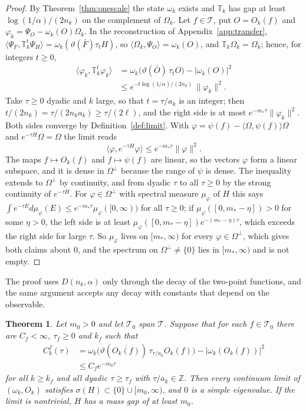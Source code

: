 \documentclass[aps,prd,twocolumn,superscriptaddress,nofootinbib,longbibliography,floatfix,amsmath,amssymb,10pt]{revtex4-2}
\newtheorem{theorem}{Theorem}
\theoremstyle{definition}
\theoremstyle{remark}
\newcommand{\Z}{\mathbb{Z}}
\newcommand{\ip}[2]{\langle #1,#2\rangle}
\begin{document}
\begin{proof}
By Theorem~\ref{thm:onescale} the state $\omega_k$ exists and $\mathbb T_k$ has gap
at least $\log(1/\alpha)/(2n_k)$ on the complement of $\Omega_k$. Let $f\in
\mathcal T$, put $O=O_k(f)$ and $\varphi_k=\Psi_O-\omega_k(O)\Omega_k$. In
the reconstruction of Appendix~\ref{app:transfer},
$\ip{\Psi_F}{\mathbb T_k^t\Psi_H}=\omega_k(\vartheta(\bar F)\tau_tH)$, so
$\ip{\Omega_k}{\Psi_O}=\omega_k(O)$, and $\mathbb T_k\Omega_k=\Omega_k$; hence, for integers $t\ge0$,
\[
\begin{split}
\ip{\varphi_k}{\mathbb T_k^t\varphi_k}&=\omega_k\bigl(\vartheta(\bar O)\,\tau_tO\bigr)
-|\omega_k(O)|^2\\
&\le e^{-t\log(1/\alpha)/(2n_k)}\,\|\varphi_k\|^2 .
\end{split}
\]
Take $\tau\ge0$ dyadic and $k$ large, so that $t=\tau/a_k$ is an integer;
then $t/(2n_k)=\tau/(2n_ka_k)\ge\tau/(2\ell)$, and the right side is at most
$e^{-m_*\tau}\|\varphi_k\|^2$. Both sides converge by
Definition~\ref{def:limit}. With $\varphi=\psi(f)-\ip\Omega{\psi(f)}\Omega$
and $e^{-\tau H}\Omega=\Omega$ the limit reads
\[
\ip\varphi{e^{-\tau H}\varphi}\le e^{-m_*\tau}\|\varphi\|^2 .
\]
The maps $f\mapsto O_k(f)$ and $f\mapsto\psi(f)$ are linear, so the vectors
$\varphi$ form a linear subspace, and it is dense in $\Omega^\perp$ because
the range of $\psi$ is dense. The inequality extends to $\Omega^\perp$ by
continuity, and from dyadic $\tau$ to all $\tau\ge0$ by the strong continuity
of $e^{-\tau H}$. For $\varphi\in\Omega^\perp$ with spectral measure
$\mu_\varphi$ of $H$ this says $\int e^{-\tau E}d\mu_\varphi(E)\le e^{-m_*\tau}
\mu_\varphi([0,\infty))$ for all $\tau\ge0$; if $\mu_\varphi([0,m_*-\eta])>0$
for some $\eta>0$, the left side is at least $\mu_\varphi([0,m_*-\eta])
e^{-(m_*-\eta)\tau}$, which exceeds the right side for large $\tau$. So
$\mu_\varphi$ lives on $[m_*,\infty)$ for every $\varphi\in\Omega^\perp$, which
gives both claims about $0$, and the spectrum on $\Omega^\perp\ne\{0\}$ lies in
$[m_*,\infty)$ and is not empty.
\end{proof}

The proof uses $D(n_k,\alpha)$ only through the decay of the two-point
functions, and the same argument accepts any decay with constants that
depend on the observable.

\begin{theorem}\label{thm:clustering}
Let $m_0>0$ and let $\mathcal T_0$ span $\mathcal T$. Suppose that for each
$f\in\mathcal T_0$ there are $C_f<\infty$, $\tau_f\ge0$ and $k_f$ such that
\begin{align*}
C^f_k(\tau)&=\omega_k\bigl(\vartheta(\overline{O_k(f)})\,\tau_{\tau/a_k}
O_k(f)\bigr)-|\omega_k(O_k(f))|^2\\
&\le C_fe^{-m_0\tau}
\end{align*}
for all $k\ge k_f$ and all dyadic $\tau\ge\tau_f$ with $\tau/a_k\in\Z$.
Then every continuum limit of $(\omega_k,O_k)$ satisfies $\sigma(H)\subset
\{0\}\cup[m_0,\infty)$, and $0$ is a simple eigenvalue. If the limit is
nontrivial, $H$ has a mass gap of at least $m_0$.
\end{theorem}
\end{document}
